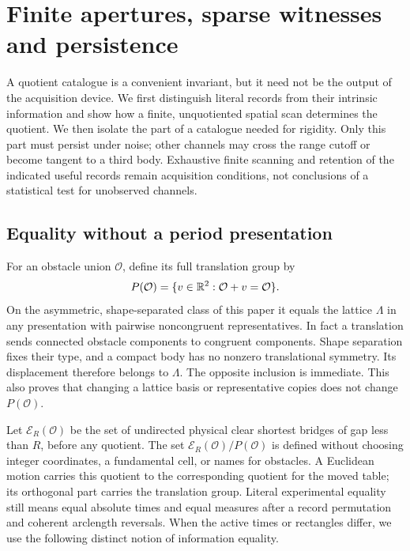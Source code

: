 \section{Finite apertures, sparse witnesses and persistence}
\label{sec:aperture}
A quotient catalogue is a convenient invariant, but it need not be the
output of the acquisition device. We first distinguish literal records
from their intrinsic information and show how a finite, unquotiented
spatial scan determines the quotient. We then isolate the part of a
catalogue needed for rigidity. Only this part must persist under noise;
other channels may cross the range cutoff or become tangent to a third
body. Exhaustive finite scanning and retention of the indicated useful
records remain acquisition conditions, not conclusions of a statistical
test for unobserved channels.

\subsection{Equality without a period presentation}
For an obstacle union $\mathcal O$, define its full translation group by
\[
 P(\mathcal O)=\{v\in\mathbb R^2:\mathcal O+v=\mathcal O\}.
\]
On the asymmetric, shape-separated class of this paper it equals the
lattice $\Lambda$ in any presentation with pairwise noncongruent
representatives. In fact a translation sends connected obstacle
components to congruent components. Shape separation fixes their type,
and a compact body has no nonzero translational symmetry. Its displacement
therefore belongs to $\Lambda$. The opposite inclusion is immediate.
This also proves that changing a lattice basis or representative copies
does not change $P(\mathcal O)$.

Let $\mathcal E_R(\mathcal O)$ be the set of undirected physical clear
shortest bridges of gap less than $R$, before any quotient. The set
$\mathcal E_R(\mathcal O)/P(\mathcal O)$ is defined without choosing
integer coordinates, a fundamental cell, or names for obstacles. A
Euclidean motion carries this quotient to the corresponding quotient
for the moved table; its orthogonal part carries the translation group.
Literal experimental equality still means equal absolute times and equal
measures after a record permutation and coherent arclength reversals.
When the active times or rectangles differ, we use the following distinct
notion of information equality.

